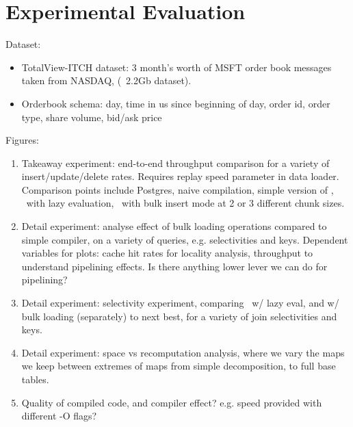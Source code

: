 \section{Experimental Evaluation}

Dataset:

\begin{itemize}
  \item TotalView-ITCH dataset: 3 month's worth of MSFT order book messages
  taken from NASDAQ, (~2.2Gb dataset).
  \item Orderbook schema: day, time in us since beginning of day, order id,
  order type, share volume, bid/ask price
\end{itemize}

Figures:

\begin{enumerate}
  \item Takeaway experiment: end-to-end throughput comparison for a variety of
  insert/update/delete rates. Requires replay speed parameter in data loader.
  Comparison points include Postgres, naive compilation, simple version
  of \compiler, \compiler\ with lazy evaluation, \compiler\ with bulk insert
  mode at 2 or 3 different chunk sizes.

  \item Detail experiment: analyse effect of bulk loading operations compared to
  simple compiler, on a variety of queries, e.g. selectivities and keys.
  Dependent variables for plots: cache hit rates for locality analysis,
  throughput to understand pipelining effects. Is there anything lower lever we
  can do for pipelining?

  \item Detail experiment: selectivity experiment, comparing \compiler\ w/ lazy
  eval, and w/ bulk loading (separately) to next best, for a variety of
  join selectivities and keys.

  \item Detail experiment: space vs recomputation analysis, where we vary the
  maps we keep between extremes of maps from simple decomposition, to full base
  tables.

  \item Quality of compiled code, and compiler effect? e.g. speed provided with
  different -O flags?
\end{enumerate}